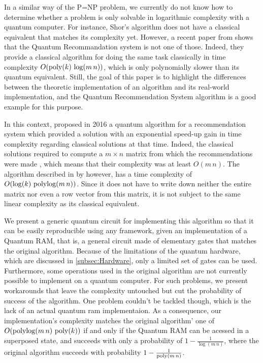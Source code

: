 \documentclass[11pt, a4paper]{article}
\begin{document}
        In a similar way of the P=NP problem, we currently do not know how to determine whether a problem is only solvable in logarithmic complexity with a quantum computer. For instance, Shor's algorithm \cite{Shor} does not have a classical equivalent that matches its complexity yet. However, a recent paper from \citeauthor{Dequantized} shows that the Quantum Recommandation system is not one of those. Indeed, they provide a classical algorithm for doing the same task classically in time complexity \(O(\operatorname{poly}(k)\,\log(m\,n))\), which is only polynomially slower than its quantum equivalent. Still, the goal of this paper is to highlight the differences between the theoretic implementation of an algorithm and its real-world implementation, and the Quantum Recommendation System algorithm is a good example for this purpose.
        
        In this context, \citeauthor{QRS} proposed in 2016 a quantum algorithm for a recommendation system which provided a solution with an exponential speed-up gain in time complexity regarding classical solutions at that time. Indeed, the classical solutions required to compute a \(m\times n\) matrix from which the recommendations were made \cite{Amazon}, which means that their complexity was at least \(O(m\,n)\). The algorithm described in \cite{QRS} by \citeauthor{QRS} however, has a time complexity of \(O(\log(k)\,\operatorname{polylog}(m\,n))\). Since it does not have to write down neither the entire matrix nor even a row vector from this matrix, it is not subject to the same linear complexity as its classical equivalent.
        
        We present a generic quantum circuit for implementing this algorithm so that it can be easily reproducible using any framework, given an implementation of a Quantum RAM, that is, a general circuit made of elementary gates that matches the original algorithm. Because of the limitations of the quantum hardware, which are discussed in \autoref{subsec:Hardware}, only a limited set of gates can be used. Furthermore, some operations used in the original algorithm are not currently possible to implement on a quantum computer. For such problems, we present workarounds that leave the complexity untouched but cut the probability of success of the algorithm. One problem couldn't be tackled though, which is the lack of an actual quantum ram implementaion. As a consequence, our implementation's complexity matches the original algorithm' one of \(O(\operatorname{polylog}(m\,n)\,\operatorname{poly}(k))\) if and only if the Quantum RAM can be acessed in a superposed state, and succeeds with only a probability of \(1-\frac{1}{\log(m\,n)}\), where the original algorithm succeeds with probability \(1 - \frac{1}{\operatorname{poly}(m\,n)}\).
        
\end{document}
